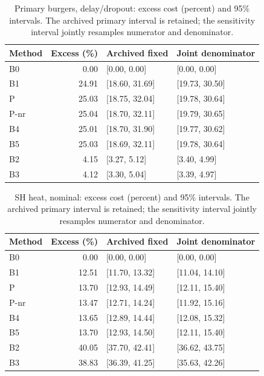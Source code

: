 \begin{table}[ht]
\caption{Primary burgers, delay/dropout: excess cost (percent) and 95\% intervals. The archived primary interval is retained; the sensitivity interval jointly resamples numerator and denominator.}\label{tab:joint_burgers_locked_delay_dropout}
\centering\small
\begin{tabular}{@{}lrll@{}}\toprule
Method & Excess (\%) & Archived fixed & Joint denominator\\\midrule
B0 & 0.00 & [0.00, 0.00] & [0.00, 0.00] \\
B1 & 24.91 & [18.60, 31.69] & [19.73, 30.50] \\
P & 25.03 & [18.75, 32.04] & [19.78, 30.64] \\
P-nr & 25.04 & [18.70, 32.11] & [19.79, 30.65] \\
B4 & 25.01 & [18.70, 31.90] & [19.77, 30.62] \\
B5 & 25.03 & [18.69, 32.11] & [19.78, 30.64] \\
B2 & 4.15 & [3.27, 5.12] & [3.40, 4.99] \\
B3 & 4.12 & [3.30, 5.04] & [3.39, 4.97] \\
\bottomrule\end{tabular}
\end{table}
\begin{table}[ht]
\caption{SH heat, nominal: excess cost (percent) and 95\% intervals. The archived primary interval is retained; the sensitivity interval jointly resamples numerator and denominator.}\label{tab:joint_heat_locked_nominal}
\centering\small
\begin{tabular}{@{}lrll@{}}\toprule
Method & Excess (\%) & Archived fixed & Joint denominator\\\midrule
B0 & 0.00 & [0.00, 0.00] & [0.00, 0.00] \\
B1 & 12.51 & [11.70, 13.32] & [11.04, 14.10] \\
P & 13.70 & [12.93, 14.49] & [12.11, 15.40] \\
P-nr & 13.47 & [12.71, 14.24] & [11.92, 15.16] \\
B4 & 13.65 & [12.89, 14.44] & [12.08, 15.32] \\
B5 & 13.70 & [12.93, 14.50] & [12.11, 15.40] \\
B2 & 40.05 & [37.70, 42.41] & [36.62, 43.75] \\
B3 & 38.83 & [36.39, 41.25] & [35.63, 42.26] \\
\bottomrule\end{tabular}
\end{table}
